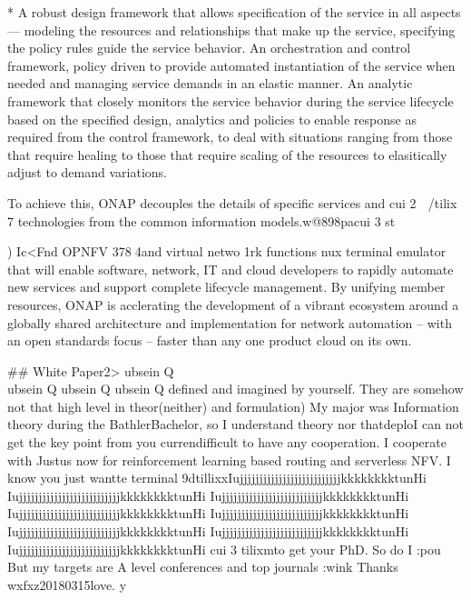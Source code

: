     * A robust design framework that allows specification of the service in
    all aspects --- modeling the resources and relationships that make up the
    service, specifying the policy rules guide the service behavior.
    An orchestration and control framework, policy driven to provide automated
    instantiation of the service when needed and managing service demands in
    an elastic manner.
    An analytic framework that closely monitors the service behavior during
    the service lifecycle based on the specified design, analytics and
    policies to enable response as required from the control framework, to
    deal with situations ranging from those that require healing to those that
    require scaling of the resources to elasitically adjust to demand
    variations.


    To achieve this, ONAP decouples the details of specific services and
    cui
    2
           /tilix
    7
    technologies from the common information models.w@898pacui
    3
    st








    )
    Ic<Fnd OPNFV
    3784and virtual netwo 1rk functions nux terminal emulator that will enable software, network, IT and cloud developers to rapidly automate new
    services and support complete lifecycle management. By unifying member resources, ONAP is acclerating the development of
    a vibrant ecosystem around a globally shared architecture and implementation for network automation -- with an open
    standards focus -- faster than any one product cloud on its own.

    ## White Paper2>
    ubsein Q \\

    ubsein Q
    ubsein Q
    ubsein Q defined and imagined by yourself. They are somehow not that high level in theor(neither) and formulation)
    My major was Information theory during the BathlerBachelor, so I understand theory nor thatdeploI can not get the key
    point from you currendifficult to have any cooperation. I cooperate with Justus now for reinforcement
    learning based routing and serverless NFV. I know you just wantte
    terminal
    9dtillixxIujjjjjjjjjjjjjjjjjjjjjjjjjjkkkkkkkktunHi IujjjjjjjjjjjjjjjjjjjjjjjjjjkkkkkkkktunHi
    IujjjjjjjjjjjjjjjjjjjjjjjjjjkkkkkkkktunHi IujjjjjjjjjjjjjjjjjjjjjjjjjjkkkkkkkktunHi
    IujjjjjjjjjjjjjjjjjjjjjjjjjjkkkkkkkktunHi IujjjjjjjjjjjjjjjjjjjjjjjjjjkkkkkkkktunHi
    IujjjjjjjjjjjjjjjjjjjjjjjjjjkkkkkkkktunHi IujjjjjjjjjjjjjjjjjjjjjjjjjjkkkkkkkktunHi cui
    3
    tilixmto get your PhD. So do I :pou
    But my targets are A level conferences and top journals :wink
    Thanks
    wxfxz20180315love.
    y

